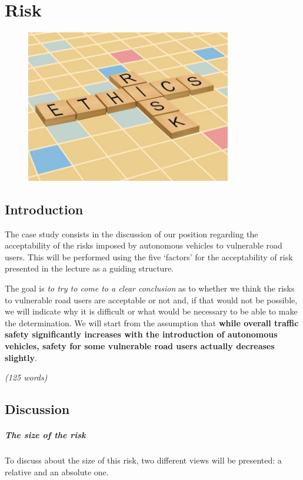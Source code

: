 \chapter{Risk}
\begin{figure}[h]
\centering
\includegraphics[width=0.8\textwidth]{Capitoli_Report/6.1_Risk.png}
\caption{\cite{picrisk}}
\label{fig:risk}
\end{figure}
\newpage
\section{Introduction}
The case study consists in the discussion of our position regarding the acceptability of the risks imposed by autonomous vehicles to vulnerable road users. This will be performed using the five ‘factors’ for the acceptability of risk presented in the lecture as a guiding structure.

The goal is \textit{to try to come to a clear conclusion} as to whether we think the risks to vulnerable road users are acceptable or not and, if that would not be possible, we will indicate why it is difficult or what would be necessary to be able to make the determination. We will start from the assumption that \textbf{while overall traffic safety significantly increases with the introduction of autonomous vehicles, safety for some vulnerable road users actually decreases slightly}.

\emph{(125 words)}

\section{Discussion}
\paragraph{The size of the risk}
To discuss about the size of this risk, two different views will be presented: a relative and an absolute one.

